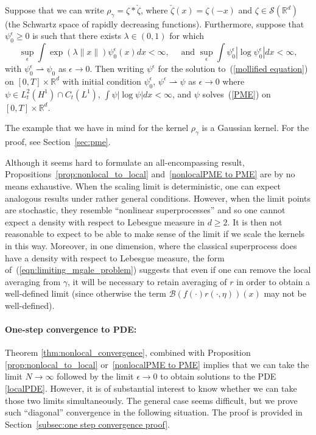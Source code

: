 \documentclass[EJP]{ejpecp} %
\newcommand{\IR}{\mathbb R}
\newcommand{\DG}{\mathcal{B}}  %
\begin{document}
\begin{proposition}
	\label{nonlocalPME to PME}
Suppose that
we can write $\rho_\gamma=\zeta*\check{\zeta}$, where $\check{\zeta}(x)=\zeta(-x)$ and
$\zeta\in\mathcal{S}(\IR^d)$ (the Schwartz space of rapidly decreasing functions).
Furthermore, suppose that %
$\psi_0^\epsilon\geq 0$ is such that
there exists $\lambda\in (0,1)$ for which
\begin{equation*}
\sup_\epsilon \int\exp(\lambda \|x\|)\psi_0^\epsilon(x)dx < \infty,\quad\mbox{ and }
\sup_\epsilon\int \psi_0^\epsilon|\log \psi_0^\epsilon|dx < \infty,
\end{equation*}
with
$\psi_0^\epsilon\rightharpoonup \psi_0$ as $\epsilon\to 0$. Then
writing $\psi^\epsilon$ for the solution to~(\ref{mollified equation})
on $[0,T]\times \IR^d$ with
initial condition $\psi_0^\epsilon$,
$\psi^\epsilon\rightharpoonup \psi$ as $\epsilon\to 0$ where
$\psi\in L_t^2(H^1)\cap C_t(L^1)$, $\int \psi|\log \psi| dx<\infty$, and
$\psi$ solves~(\ref{PME}) on $[0,T]\times \IR^d$. 
\end{proposition}

The example that we have in mind for the kernel $\rho_\gamma$ is a Gaussian kernel.
For the proof, see Section~\ref{sec:pme}.

\begin{remark} \label{remark_on_nonlocal_to_local}
Although it seems hard to formulate an all-encompassing result,
Propositions~\ref{prop:nonlocal_to_local} and~\ref{nonlocalPME to PME} are by no
means exhaustive. When the scaling limit is deterministic, one can 
expect analogous results under rather general conditions. However, when the limit
points are stochastic, they resemble ``nonlinear superprocesses'' and so one cannot
expect a density with respect to Lebesgue measure in $d\geq 2$. It is then not
reasonable to 
expect to be able to make sense of the limit if we scale the kernels in this way.
Moreover, in one dimension, where the classical superprocess does have a density with 
respect to Lebesgue measure, the form of~(\ref{eqn:limiting_mgale_problem})
suggests that even if one can remove the local averaging from $\gamma$, it
will be necessary 
to retain averaging of $r$ in order to obtain a well-defined limit 
(since otherwise the term $\DG(f(\cdot)r(\cdot,\eta))(x)$
may not be well-defined).
\end{remark}


\paragraph{One-step convergence to PDE:}
Theorem \ref{thm:nonlocal_convergence},
combined with Proposition \ref{prop:nonlocal_to_local} or~\ref{nonlocalPME to PME}
implies that we can take the limit $N \to \infty$
followed by the limit $\epsilon \to 0$
to obtain solutions to the PDE \eqref{localPDE}.
However, it is of substantial interest to know whether
we can take those two limits simultaneously.
The general case seems difficult,
but we prove such ``diagonal'' convergence in the following situation.
The proof is provided in Section~\ref{subsec:one step convergence proof}.
\end{document}
